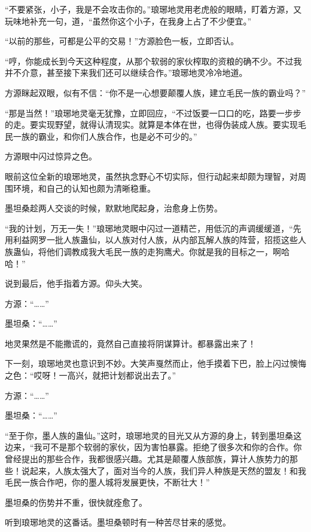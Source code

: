 
\begin{this_body}

“不要紧张，小子，我是不会攻击你的。”琅琊地灵用老虎般的眼睛，盯着方源，又玩味地补充一句，道，“虽然你这个小子，在我身上占了不少便宜。”

“以前的那些，可都是公平的交易！”方源脸色一板，立即否认。

“哼，你能成长到今天这种程度，从那个软弱的家伙榨取的资粮的确不少。不过我并不介意，甚至接下来我们还可以继续合作。”琅琊地灵冷冷地道。

方源眯起双眼，似有不信：“你不是一心想要颠覆人族，建立毛民一族的霸业吗？”

“那是当然！”琅琊地灵毫无犹豫，立即回应，“不过饭要一口口的吃，路要一步步的走。要实现野望，就得认清现实。就算是本体在世，也得伪装成人族。要实现毛民一族的霸业，和你们人族合作，也是必不可少的。”

方源眼中闪过惊异之色。

眼前这位全新的琅琊地灵，虽然执念野心不切实际，但行动起来却颇为理智，对周围环境，和自己的认知也颇为清晰稳重。

墨坦桑趁两人交谈的时候，默默地爬起身，治愈身上伤势。

“我的计划，万无一失！”琅琊地灵眼中闪过一道精芒，用低沉的声调缓缓道，“先用利益网罗一批人族蛊仙，以人族对付人族，从内部瓦解人族的阵营，招揽这些人族蛊仙，将他们调教成我大毛民一族的走狗鹰犬。你就是我的目标之一，啊哈哈！”

说到最后，他手指着方源。仰头大笑。

方源：“……”

墨坦桑：“……”

地灵果然是不能撒谎的，竟然自己直接将阴谋算计。都暴露出来了！

下一刻，琅琊地灵也意识到不妙。大笑声戛然而止，他手摸着下巴，脸上闪过懊悔之色：“哎呀！一高兴，就把计划都说出去了。”

方源：“……”

墨坦桑：“……”

“至于你，墨人族的蛊仙。”这时，琅琊地灵的目光又从方源的身上，转到墨坦桑这边来，“我可不是那个软弱的家伙，因为害怕暴露。拒绝了很多次和你的合作。你曾经提出的那些合作，我都很感兴趣。尤其是颠覆人族部族，算计人族势力的那些！说起来，人族太强大了，面对当今的人族，我们异人种族是天然的盟友！和我毛民一族合作吧，你的墨人城将发展更快，不断壮大！”

墨坦桑的伤势并不重，很快就痊愈了。

听到琅琊地灵的这番话。墨坦桑顿时有一种苦尽甘来的感觉。


\end{this_body}
